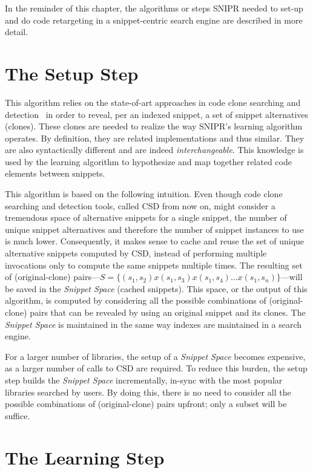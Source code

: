 In the reminder of this chapter, the algorithms or steps \uppercase{SnipR} needed to set-up and do code retargeting in a snippet-centric search engine are described in more detail. 

\section{The Setup Step}
\label{sec:precomputation}

This algorithm relies on the state-of-art approaches in code clone searching and detection~\cite{Jiang:2007cj, Roh:2010ts} in order to reveal, per an indexed snippet, a set of snippet alternatives (clones). These clones are needed to realize the way \uppercase{SnipR}'s learning algorithm operates. By definition, they are related implementations and thus similar. They are also syntactically different and are indeed \emph{interchangeable}. This knowledge is used by the learning algorithm to hypothesize and map together related code elements between snippets. 

This algorithm is based on the following intuition. Even though code clone searching and detection tools, called CSD from now on, might consider a tremendous space of alternative snippets for a single snippet, the number of unique snippet alternatives and therefore the number of snippet instances to use is much lower. Consequently, it makes sense to cache and reuse the set of unique alternative snippets computed by CSD, instead of performing multiple invocations only to compute the same snippets multiple times. The resulting set of (original-clone) pairs---$S = \{(s_1, s_2) x (s_1, s_3) x (s_1, s_4) ... x (s_1, s_n)\}$---will be saved in the \emph{Snippet Space} (cached snippets). This space, or the output of this algorithm, is computed by considering all the possible combinations of (original-clone) pairs that can be revealed by using an original snippet and its clones. The \emph{Snippet Space} is maintained in the same way indexes are maintained in a search engine.

For a larger number of libraries, the setup of a \emph{Snippet Space} becomes expensive, as a larger number of calls to CSD are required. To reduce this burden, the setup step builds the \emph{Snippet Space} incrementally, in-sync with the most popular libraries searched by users. By doing this, there is no need to consider all the possible combinations of (original-clone) pairs upfront; only a subset will be suffice.

\section{The Learning Step}
\label{sec:learning}

